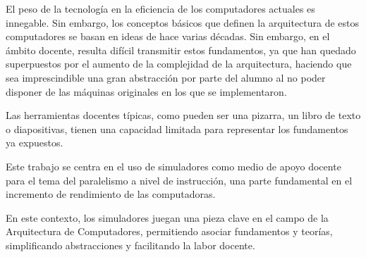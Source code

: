 El peso de la tecnología en la eficiencia de los computadores actuales es innegable. Sin embargo, los 
conceptos básicos que definen la arquitectura de estos computadores se basan en ideas de hace varias décadas.
Sin embargo, en el ámbito docente, resulta difícil transmitir estos fundamentos, ya que han quedado superpuestos
por el aumento de la complejidad de la arquitectura, haciendo que sea imprescindible una gran abstracción por 
parte del alumno al no poder disponer de las máquinas originales en los que se implementaron.

\bigskip
Las herramientas docentes típicas, como pueden ser una pizarra, un libro de texto
o diapositivas, tienen una capacidad limitada para representar los fundamentos
ya expuestos.

\bigskip
Este trabajo se centra en el uso de simuladores como medio de apoyo docente para el 
tema del  paralelismo a nivel de instrucción, una parte fundamental en el incremento
de rendimiento de las computadoras.

\bigskip
En este contexto, los simuladores juegan una pieza clave en el campo de la Arquitectura de Computadores,
permitiendo asociar fundamentos y teorías, simplificando abstracciones y facilitando la labor docente.